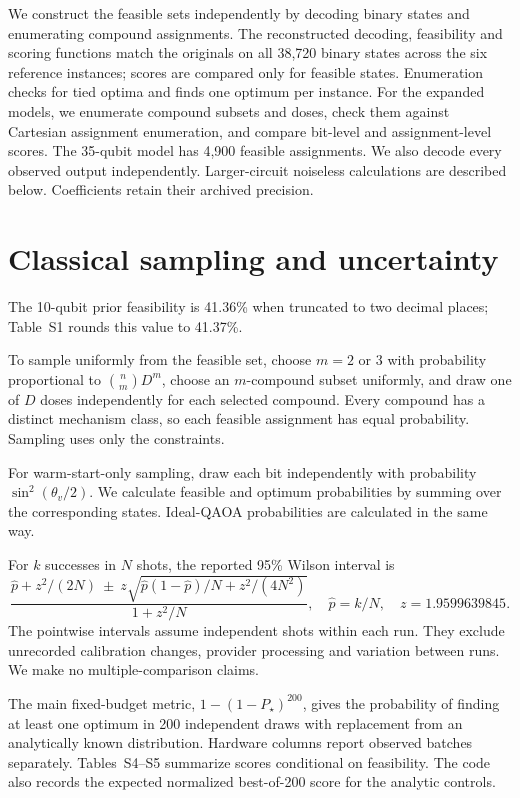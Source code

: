 \documentclass[utf8]{frontiers_suppmat}
\begin{document}
We construct the feasible sets independently by decoding binary states and enumerating compound assignments. The reconstructed decoding, feasibility and scoring functions match the originals on all 38,720 binary states across the six reference instances; scores are compared only for feasible states. Enumeration checks for tied optima and finds one optimum per instance. For the expanded models, we enumerate compound subsets and doses, check them against Cartesian assignment enumeration, and compare bit-level and assignment-level scores. The 35-qubit model has 4,900 feasible assignments. We also decode every observed output independently. Larger-circuit noiseless calculations are described below. Coefficients retain their archived precision.

\section{Classical sampling and uncertainty}
The 10-qubit prior feasibility is 41.36\% when truncated to two decimal places; Table~S1 rounds this value to 41.37\%.

To sample uniformly from the feasible set, choose $m=2$ or $3$ with probability proportional to $\binom{n}{m}D^m$, choose an $m$-compound subset uniformly, and draw one of $D$ doses independently for each selected compound. Every compound has a distinct mechanism class, so each feasible assignment has equal probability. Sampling uses only the constraints.

For warm-start-only sampling, draw each bit independently with probability $\sin^2(\theta_v/2)$. We calculate feasible and optimum probabilities by summing over the corresponding states. Ideal-QAOA probabilities are calculated in the same way.

For $k$ successes in $N$ shots, the reported 95\% Wilson interval is
\begin{equation}
 \frac{\hat p+z^2/(2N)\ \pm\ z\sqrt{\hat p(1-\hat p)/N+z^2/(4N^2)}}{1+z^2/N},
 \quad \hat p=k/N,\quad z=1.9599639845.
\end{equation}
The pointwise intervals assume independent shots within each run. They exclude unrecorded calibration changes, provider processing and variation between runs. We make no multiple-comparison claims.

The main fixed-budget metric, $1-(1-P_\star)^{200}$, gives the probability of finding at least one optimum in 200 independent draws with replacement from an analytically known distribution. Hardware columns report observed batches separately. Tables~S4--S5 summarize scores conditional on feasibility. The code also records the expected normalized best-of-200 score for the analytic controls.
\end{document}
